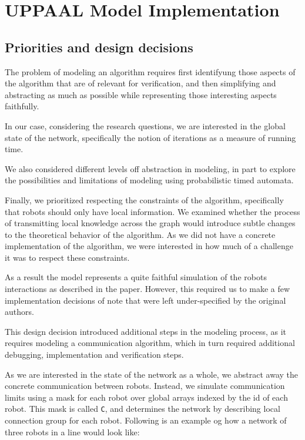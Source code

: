 \section{UPPAAL Model Implementation}

\subsection{Priorities and design decisions}

The problem of modeling an algorithm requires first identifyung those aspects of the algorithm that are of relevant for verification, and then simplifying and abstracting as much as possible while representing those interesting aspects faithfully.

In our case, considering the research questions, we are interested in the global state of the network, specifically the notion of iterations as a measure of running time.

We also considered different levels off abstraction in modeling, in part to explore the possibilities and limitations of modeling using probabilistic timed automata.

Finally, we prioritized respecting the constraints of the algorithm, specifically that robots should only have local information. We examined whether the process of transmitting local knowledge across the graph would introduce subtle changes to the theoretical behavior of the algorithm.
As we did not have a concrete implementation of the algorithm, we were interested in how much of a challenge it was to respect these constraints.

As a result the model represents a quite faithful simulation of the robots interactions as described in the paper. However, this required us to make a few implementation decisions of note that were left under-specified by the original authors.

This design decision introduced additional steps in the modeling process, as it requires modeling a communication algorithm, which in turn required additional debugging, implementation and verification steps.

As we are interested in the state of the network as a whole, we abstract away the concrete communication between robots. Instead, we simulate communication limits using a mask for each robot over global arrays indexed by the id of each robot. This mask is called \texttt{C}, and determines the network by describing local connection group for each robot. Following is an example og how a network of three robots in a line would look like:

